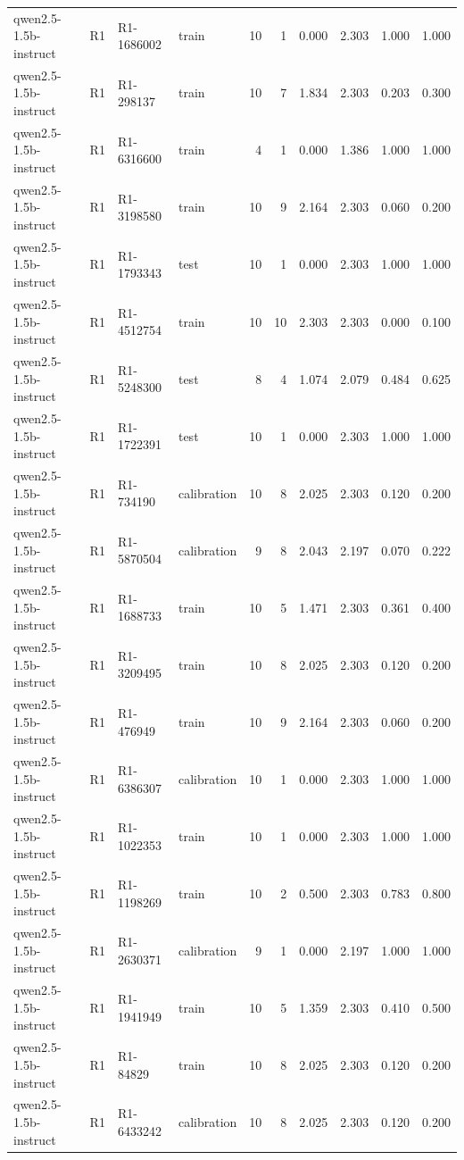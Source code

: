 \begin{table}
\begin{tabular}{llllrrrrrr}
qwen2.5-1.5b-instruct & R1 & R1-1686002 & train & 10 & 1 & 0.000 & 2.303 & 1.000 & 1.000 \\
qwen2.5-1.5b-instruct & R1 & R1-298137 & train & 10 & 7 & 1.834 & 2.303 & 0.203 & 0.300 \\
qwen2.5-1.5b-instruct & R1 & R1-6316600 & train & 4 & 1 & 0.000 & 1.386 & 1.000 & 1.000 \\
qwen2.5-1.5b-instruct & R1 & R1-3198580 & train & 10 & 9 & 2.164 & 2.303 & 0.060 & 0.200 \\
qwen2.5-1.5b-instruct & R1 & R1-1793343 & test & 10 & 1 & 0.000 & 2.303 & 1.000 & 1.000 \\
qwen2.5-1.5b-instruct & R1 & R1-4512754 & train & 10 & 10 & 2.303 & 2.303 & 0.000 & 0.100 \\
qwen2.5-1.5b-instruct & R1 & R1-5248300 & test & 8 & 4 & 1.074 & 2.079 & 0.484 & 0.625 \\
qwen2.5-1.5b-instruct & R1 & R1-1722391 & test & 10 & 1 & 0.000 & 2.303 & 1.000 & 1.000 \\
qwen2.5-1.5b-instruct & R1 & R1-734190 & calibration & 10 & 8 & 2.025 & 2.303 & 0.120 & 0.200 \\
qwen2.5-1.5b-instruct & R1 & R1-5870504 & calibration & 9 & 8 & 2.043 & 2.197 & 0.070 & 0.222 \\
qwen2.5-1.5b-instruct & R1 & R1-1688733 & train & 10 & 5 & 1.471 & 2.303 & 0.361 & 0.400 \\
qwen2.5-1.5b-instruct & R1 & R1-3209495 & train & 10 & 8 & 2.025 & 2.303 & 0.120 & 0.200 \\
qwen2.5-1.5b-instruct & R1 & R1-476949 & train & 10 & 9 & 2.164 & 2.303 & 0.060 & 0.200 \\
qwen2.5-1.5b-instruct & R1 & R1-6386307 & calibration & 10 & 1 & 0.000 & 2.303 & 1.000 & 1.000 \\
qwen2.5-1.5b-instruct & R1 & R1-1022353 & train & 10 & 1 & 0.000 & 2.303 & 1.000 & 1.000 \\
qwen2.5-1.5b-instruct & R1 & R1-1198269 & train & 10 & 2 & 0.500 & 2.303 & 0.783 & 0.800 \\
qwen2.5-1.5b-instruct & R1 & R1-2630371 & calibration & 9 & 1 & 0.000 & 2.197 & 1.000 & 1.000 \\
qwen2.5-1.5b-instruct & R1 & R1-1941949 & train & 10 & 5 & 1.359 & 2.303 & 0.410 & 0.500 \\
qwen2.5-1.5b-instruct & R1 & R1-84829 & train & 10 & 8 & 2.025 & 2.303 & 0.120 & 0.200 \\
qwen2.5-1.5b-instruct & R1 & R1-6433242 & calibration & 10 & 8 & 2.025 & 2.303 & 0.120 & 0.200 \\

\end{tabular}
\end{table}
